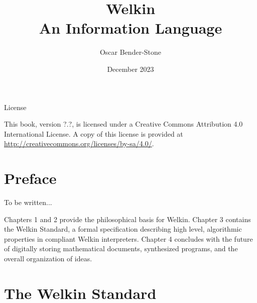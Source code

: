 \documentclass[oneside, leqno]{book}
\title{Welkin \\
  An Information Language}
\author{Oscar Bender-Stone}
\date{December 2023}
\begin{document}
\maketitle


\begin{center}
{\sc License}\

\vspace{2ex}
This book, version ?.?, is licensed under a Creative Commons Attribution 4.0 International License.
A copy of this license is provided at \url{http://creativecommons.org/licenses/by-sa/4.0/}.
\end{center}

\newpage

\chapter*{Preface}

To be written...


Chapters 1 and 2 provide the philosophical basis for Welkin. Chapter 3 contains the Welkin Standard, a formal specification describing high level, algorithmic properties in compliant Welkin interpreters. Chapter 4 concludes with the future of digitally storing mathematical documents, synthesized programs, and the overall organization of ideas.


\mainmatter



\chapter{The Welkin Standard}


\end{document}
